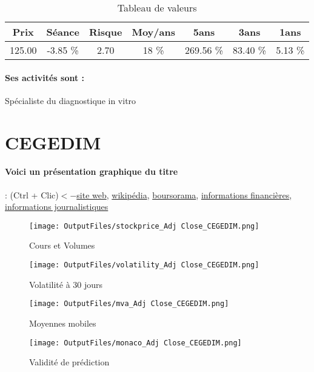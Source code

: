 \documentclass[11pt,a4paper]{report}%
\begin{document}
\begin{table}[H]
  \centering
    \begin{tabular}{|c|c|c|c|c|c|c|}
    \hline
    Prix & Séance & Risque  & Moy/ans & 5ans & 3ans & 1ans \\
    \hline
    125.00 &    -3.85 \%    & 2.70 & 18 \% & 269.56 \% & 83.40 \% & 5.13 \% \\
    \hline
    \end{tabular}%
        \label{tab:table_BIOMERIEUX}%
      \caption{Tableau de valeurs}
\end{table}%

\paragraph{Ses activités sont : } Spécialiste du diagnostique in vitro 
    
    \newpage

\section{CEGEDIM}

\paragraph{Voici un présentation graphique du titre} : (Ctrl + Clic)$<-$\href{https://www.cegedim.fr/finance/documentation/Pages/presentations.aspx}{site web}, \href{https://fr.wikipedia.org/wiki/Cegedim}{wikipédia}, \href{https://www.boursorama.com/cours/1rPCGM}{boursorama}, \href{https://www.qwant.com/?q=site:https:%2f%2fwww.easybourse.com%2faction-societe%2fCEGEDIM&t=web&client=ext-firefox-hp}{informations financières}, \href{https://bourse.lerevenu.com/cours-de-bourse/fiche-valeur-synthese/CEGEDIM/CGM-FR}{informations journalistiques}
\begin{figure}[!htb]
   \begin{minipage}{0.5\textwidth}
     \centering
     \texttt{[image: OutputFiles/stockprice\_Adj Close\_CEGEDIM.png]}
     \caption{Cours et Volumes}\label{Fig:price_CEGEDIM}
   \end{minipage}\hfill
   \begin{minipage}{0.5\textwidth}
     \centering
     \texttt{[image: OutputFiles/volatility\_Adj Close\_CEGEDIM.png]}
     \caption{Volatilité à 30 jours}\label{Fig:volat_CEGEDIM}
   \end{minipage}
\end{figure}
\begin{figure}[!htb]
   \begin{minipage}{0.5\textwidth}
     \centering
     \texttt{[image: OutputFiles/mva\_Adj Close\_CEGEDIM.png]}
     \caption{Moyennes mobiles}\label{Fig:mva_CEGEDIM}
   \end{minipage}\hfill
   \begin{minipage}{0.5\textwidth}
     \centering
     \texttt{[image: OutputFiles/monaco\_Adj Close\_CEGEDIM.png]}
     \caption{Validité de prédiction}\label{Fig:prediction_CEGEDIM}
   \end{minipage}
\end{figure}
\end{document}
